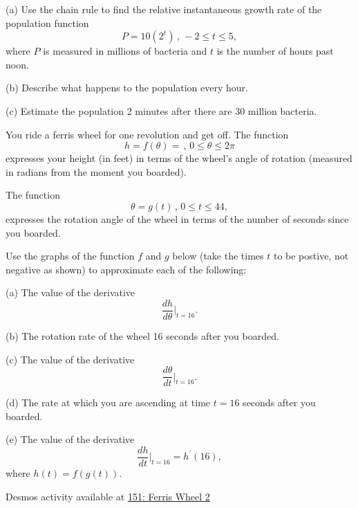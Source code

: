 \documentclass{ximera}
\begin{document}
\begin{example}  \label{Ex:CHHODDrer}
 (a) Use the chain rule to find the relative instantaneous growth rate of the population function
\[
      P = 10 (2^t)  \, , \, -2\leq t \leq 5 ,
\]
where $P$ is measured in millions of bacteria and $t$ is the number of hours past noon.

(b) Describe what happens to the population every hour.

(c) Estimate the population 2 minutes after there are 30 million bacteria.
\end{example}




\begin{example}  \label{Ex:CHdfthghhyhpp}

You ride a ferris wheel for one revolution and get off. The function 
\[
    h = f(\theta) = \, , \, 0\leq \theta \leq 2\pi    %
\]
expresses your height (in feet) in terms of the wheel's angle of rotation (measured in radians from the moment you boarded).

The function 
\[
    \theta = g(t) \, , \, 0\leq t \leq 44, 
\]
expresses the rotation angle of the wheel in terms of the number of seconds since  you boarded.

Use the graphs of the function $f$ and $g$ below (take the times $t$ to be postive, not negative as shown) to approximate each of the following:

(a) The value of the derivative 
\[
   \frac{dh}{d\theta}\Big|_{t = 16} .
\]

(b) The rotation rate of the wheel 16 seconds after you boarded.

(c) The value of the derivative 
\[
    \frac{d\theta}{dt}\Big|_{t=16} .
\]

(d) The rate at which you are ascending at time $t=16$ seconds after you boarded.

(e) The value of the derivative
\[
   \frac{dh}{dt}\Big|_{t=16}  =  h^\prime(16),
\]
where $h(t) = f(g(t))$.

\begin{onlineOnly}
    \begin{center}
\end{center}
\end{onlineOnly}

Desmos activity available at \href{https://www.desmos.com/calculator/bqlbmfzzxf}{151: Ferris Wheel 2}

\end{example}
\end{document}
